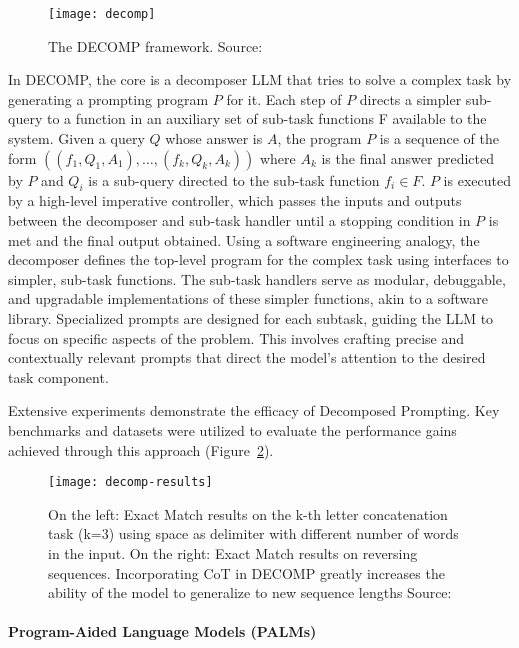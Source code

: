 \begin{figure}[h!]
	\centering
	\texttt{[image: decomp]}
	\caption{The DECOMP framework. Source: \textcite{khot2022decomposed}}
	\label{fig:decomp}
\end{figure}

In DECOMP, the core is a decomposer LLM that tries to solve a complex task by generating a prompting program $P$ for it.
Each step of $P$ directs a simpler sub-query to a function in an auxiliary set of sub-task functions F available to the system.
Given a query $Q$ whose answer is $A$, the program $P$ is a sequence of the form $((f_1, Q_1, A_1), \ldots ,(f_k, Q_k, A_k))$
where $A_k$ is the final answer predicted by $P$ and $Q_i$ is a sub-query directed to the sub-task function $f_i \in F$.
$P$ is executed by a high-level imperative controller, which passes the inputs and outputs between the decomposer and sub-task handler until a stopping condition in $P$ is met and the final output obtained.
Using a software engineering analogy, the decomposer defines the top-level program for the complex task using interfaces to simpler, sub-task functions.
The sub-task handlers serve as modular, debuggable, and upgradable implementations of these simpler functions, akin to a software library.
Specialized prompts are designed for each subtask, guiding the LLM to focus on specific aspects of the problem.
This involves crafting precise and contextually relevant prompts that direct the model's attention to the desired task component.

Extensive experiments demonstrate the efficacy of Decomposed Prompting.
Key benchmarks and datasets were utilized to evaluate the performance gains achieved through this approach (Figure~\ref{fig:decomp-results}).

\begin{figure}[h!]
	\centering
	\texttt{[image: decomp-results]}
	\caption{On the left: Exact Match results on the k-th letter concatenation task (k=3) using space as delimiter with different number of words in the input. On the right: Exact Match results on reversing sequences. Incorporating CoT in DECOMP greatly increases the ability of the model to generalize to new sequence lengths Source: \textcite{khot2022decomposed}}
	\label{fig:decomp-results}
\end{figure}

\paragraph{Program-Aided Language Models (PALMs)}
\label{par:program-aided-language-models}

